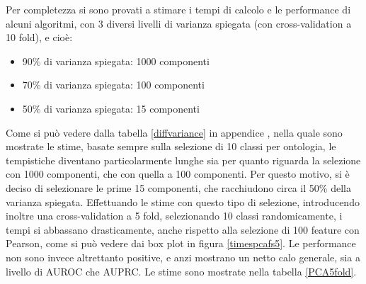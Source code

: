 \documentclass[12pt]{report}
\begin{document}
Per completezza si sono provati a stimare i tempi di calcolo e le performance di alcuni algoritmi, con 3 diversi livelli di varianza spiegata (con cross-validation a 10 fold), e cioè:
\begin{itemize}
\item 90\% di varianza spiegata: 1000 componenti
\item 70\% di varianza spiegata: 100 componenti
\item 50\% di varianza spiegata: 15 componenti
\end{itemize}
Come si può vedere dalla tabella \ref{diffvariance} in appendice , nella quale sono mostrate le stime, basate sempre sulla selezione di 10 classi per ontologia, le tempistiche diventano particolarmente lunghe sia per quanto riguarda la selezione con 1000 componenti, che con quella a 100 componenti.
\newline
\newline
Per questo motivo, si è deciso di selezionare le prime 15 componenti, che racchiudono circa il 50\% della varianza spiegata.
\newline
\newline
Effettuando le stime con questo tipo di selezione, introducendo inoltre una cross-validation a 5 fold, selezionando 10 classi randomicamente, i tempi si abbassano drasticamente, anche rispetto alla selezione di 100 feature con Pearson, come si può vedere dai box plot in figura \ref{timespcafs5}. Le performance non sono invece altrettanto positive, e anzi mostrano un netto calo generale, sia a livello di AUROC che AUPRC. Le stime sono mostrate nella tabella \ref{PCA5fold}.
\end{document}
